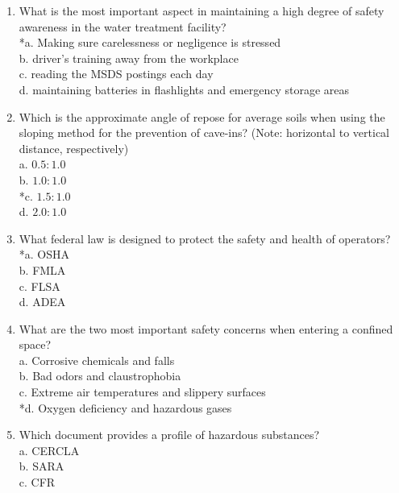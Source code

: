 
\begin{enumerate}[1.]

\item What is the most important aspect in maintaining a high degree of safety awareness in the water treatment facility?\\
*a. Making sure carelessness or negligence is stressed\\
b. driver's training away from the workplace\\
c. reading the MSDS postings each day\\
d. maintaining batteries in flashlights and emergency storage areas\\
\item Which is the approximate angle of repose for average soils when using the sloping method for the prevention of cave-ins? (Note: horizontal to vertical distance, respectively)\\
a. $0.5: 1.0$\\
b. $1.0: 1.0$\\
*c. $1.5: 1.0$\\
d. $2.0: 1.0$\\
\item What federal law is designed to protect the safety and health of operators?\\
*a. OSHA\\
b. FMLA\\
c. FLSA\\
d. ADEA\\
\item What are the two most important safety concerns when entering a confined space?\\
a. Corrosive chemicals and falls\\
b. Bad odors and claustrophobia\\
c. Extreme air temperatures and slippery surfaces\\
*d. Oxygen deficiency and hazardous gases\\
\item Which document provides a profile of hazardous substances?\\
a. CERCLA\\
b. SARA\\
c. CFR\\

\end{enumerate}
